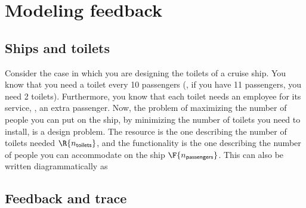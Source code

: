 
\section{Modeling feedback}
\label{sec:modeling-feedback}



\subsection{Ships and toilets}

Consider the case in which you are designing the toilets of a cruise ship.
You know that you need a toilet every 10 passengers (\ie, if you have 11 passengers, you need 2 toilets).
Furthermore, you know that each toilet needs an employee for its service, \ie, an extra passenger.
Now, the problem of maximizing the number of people you can put on the ship, by minimizing the number of toilets you need to install, is a design problem.
The resource  is the one describing the number of toilets needed $\R{n_\mathsf{toilets}}$, and the functionality  is the one describing the number of people you can accommodate on the ship $\F{n_\mathsf{passengers}}$.
This can also be written diagrammatically as



\subsection{Feedback and trace}




